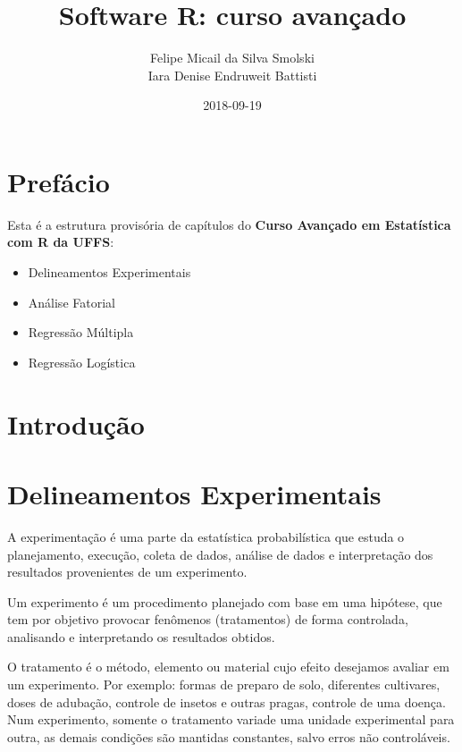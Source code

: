 \documentclass[12pt,brazil,oneside]{book}
\title{Software R: curso avançado}
\author{Felipe Micail da Silva Smolski \\ Iara Denise Endruweit Battisti}
\date{2018-09-19}
\providecommand{\tightlist}{%
  \setlength{\itemsep}{0pt}\setlength{\parskip}{0pt}}
\begin{document}
\maketitle

{
\setcounter{tocdepth}{1}
\tableofcontents
}
\hypertarget{prefacio}{%
\chapter*{Prefácio}\label{prefacio}}

Esta é a estrutura provisória de capítulos do \textbf{Curso Avançado em
Estatística com R da UFFS}:

\begin{itemize}
\tightlist
\item
  Delineamentos Experimentais
\item
  Análise Fatorial
\item
  Regressão Múltipla
\item
  Regressão Logística
\end{itemize}

\hypertarget{introducao}{%
\chapter*{Introdução}\label{introducao}}

\hypertarget{delineamentos-experimentais}{%
\chapter{Delineamentos
Experimentais}\label{delineamentos-experimentais}}

A experimentação é uma parte da estatística probabilística que estuda o
planejamento, execução, coleta de dados, análise de dados e
interpretação dos resultados provenientes de um experimento.

Um experimento é um procedimento planejado com base em uma hipótese, que
tem por objetivo provocar fenômenos (tratamentos) de forma controlada,
analisando e interpretando os resultados obtidos.

O tratamento é o método, elemento ou material cujo efeito desejamos
avaliar em um experimento. Por exemplo: formas de preparo de solo,
diferentes cultivares, doses de adubação, controle de insetos e outras
pragas, controle de uma doença. Num experimento, somente o tratamento
variade uma unidade experimental para outra, as demais condições são
mantidas constantes, salvo erros não controláveis.
\end{document}
